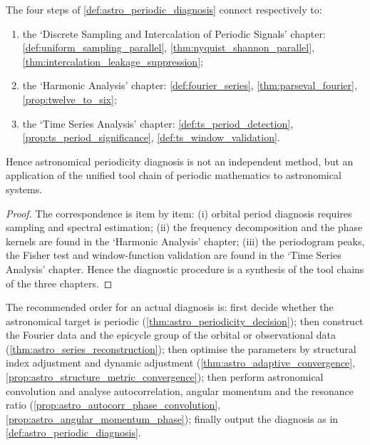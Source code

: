 \begin{theorem}\label{thm:astro_diagnosis_integration}
The four steps of \cref{def:astro_periodic_diagnosis} connect respectively to:
\begin{enumerate}[label=(\roman*)]
    \item the `Discrete Sampling and Intercalation of Periodic Signals' chapter: \cref{def:uniform_sampling_parallel}, \cref{thm:nyquist_shannon_parallel}, \cref{thm:intercalation_leakage_suppression};
    \item the `Harmonic Analysis' chapter: \cref{def:fourier_series}, \cref{thm:parseval_fourier}, \cref{prop:twelve_to_six};
    \item the `Time Series Analysis' chapter: \cref{def:ts_period_detection}, \cref{prop:ts_period_significance}, \cref{def:ts_window_validation}.
\end{enumerate}
Hence astronomical periodicity diagnosis is not an independent method, but an application of the unified tool chain of periodic mathematics to astronomical systems.
\end{theorem}

\begin{proof}
The correspondence is item by item:
(i) orbital period diagnosis requires sampling and spectral estimation;
(ii) the frequency decomposition and the phase kernels are found in the `Harmonic Analysis' chapter;
(iii) the periodogram peaks, the Fisher test and window-function validation are found in the `Time Series Analysis' chapter.
Hence the diagnostic procedure is a synthesis of the tool chains of the three chapters.
\end{proof}

\begin{remark}\label{rem:astro_integration_order}
The recommended order for an actual diagnosis is: first decide whether the astronomical target is periodic (\cref{thm:astro_periodicity_decision}); then construct the Fourier data and the epicycle group of the orbital or observational data (\cref{thm:astro_series_reconstruction}); then optimise the parameters by structural index adjustment and dynamic adjustment (\cref{thm:astro_adaptive_convergence}, \cref{prop:astro_structure_metric_convergence}); then perform astronomical convolution and analyse autocorrelation, angular momentum and the resonance ratio (\cref{prop:astro_autocorr_phase_convolution}, \cref{prop:astro_angular_momentum_phase}); finally output the diagnosis as in \cref{def:astro_periodic_diagnosis}.
\end{remark}

